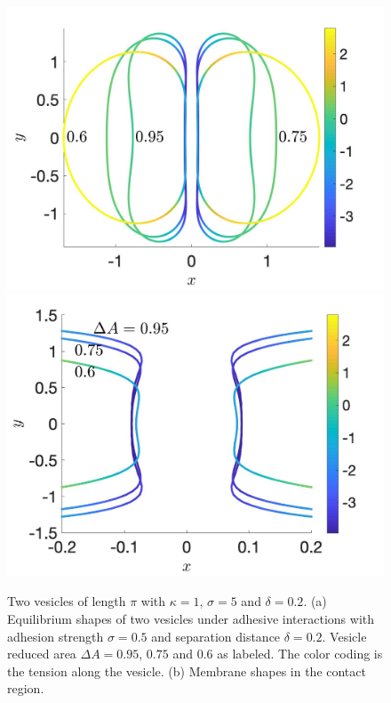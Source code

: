 \documentclass[%
preprint,
 amsmath,amssymb,
 aps,
]{revtex4-1}
\begin{document}
\begin{figure}
\includegraphics[keepaspectratio=true,scale=0.175]{figs/Dec18_vesicle_shape_vs_rA_00.jpeg}
\includegraphics[keepaspectratio=true,scale=0.175]{figs/Dec18_vesicle_shape_vs_rA_01.jpeg}
\caption{Two vesicles of length $\pi$ with $\kappa=1$, $\sigma=5$ and $\delta=0.2$.
(a) Equilibrium shapes of two vesicles under adhesive  interactions with adhesion strength $\sigma=0.5$ and separation distance $\delta=0.2$. 
Vesicle reduced area $\Delta A=0.95$, $0.75$ and $0.6$ as labeled.
 The color coding is the tension along the vesicle. (b) Membrane shapes in the contact region.}
\label{fig:Dec18_vesicle_shape}
\end{figure}
\end{document}
